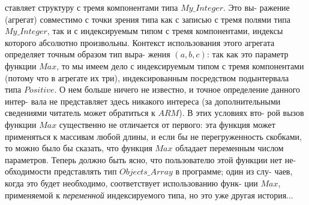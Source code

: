 \documentclass{./git_rep/mai_prac_2017/template/mai_book}
\begin{document}
ставляет структуру с тремя компонентами типа $My\_Integer$. Это вы-\linebreak
ражение  (агрегат) совместимо с точки зрения типа как с записью с\linebreak
тремя полями типа $My\_Integer$, так и с индексируемым типом с тремя\linebreak
компонентами,  индексы  которого абсолютно произвольны.  Контекст\linebreak
\newpage
\noindent
использования  этого  агрегата  определяет  точным  образом  тип  выра-\linebreak
жения $(a,b,c)$: так как это параметр функции $Max$, то мы имеем  дело с\linebreak
индексируемым  типом  с  тремя  компонентами  (потому  что  в  агрегате\linebreak
их три),  индексированным посредством подынтервала типа $Positive$. О\linebreak 
нем  больше  ничего  не  известно,  и  точное  определение  данного  интер-\linebreak
вала  не  представляет  здесь  никакого  интереса  (за  дополнительными\linebreak
сведениями читатель может обратиться к $ARM$). В этих условиях вто-\linebreak
рой  вызов  функции $Max$ существенно  не  отличается  от  первого:  эта\linebreak
функция  может  применяться  к  массивам  любой  длины,  и  если  бы  не\linebreak
перегруженность  скобками,  то  можно  было  бы  сказать,  что  функция\linebreak
$Max$ обладает переменным  числом  параметров.\newline
\hspace*{15pt}Теперь  должно быть ясно,  что  пользователю этой  функции  нет  не-\linebreak
обходимости представлять тип $Objects\_Array$ в программе; один из слу-\linebreak
чаев, когда это будет необходимо, соответствует использованию функ-\linebreak
ции $Max$, применяемой к \textit{переменной} индексируемого  типа,  но это уже\linebreak
другая  история...
\end{document}
